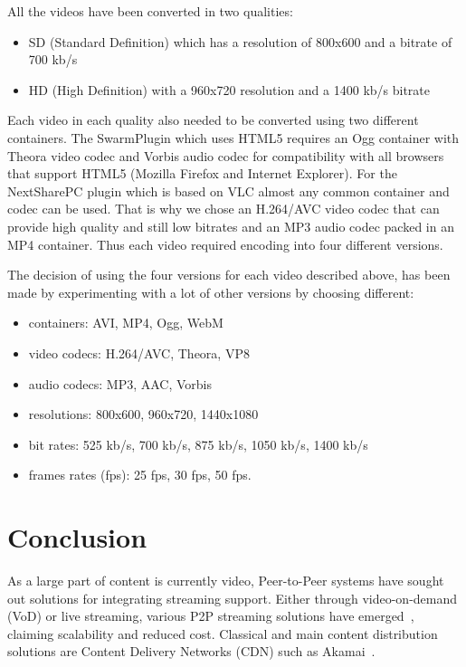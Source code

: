 All the videos have been converted in two qualities: 
\begin{itemize}
  \item SD (Standard Definition) which has a resolution of 800x600 and a
  bitrate of 700 kb/s
  \item HD (High Definition) with a 960x720 resolution and a 1400 kb/s bitrate
\end{itemize}

Each video in each quality also needed to be converted using two different
containers. The SwarmPlugin which uses HTML5 requires an Ogg container with
Theora video codec and Vorbis audio codec for compatibility with all browsers
that support HTML5 (Mozilla Firefox and Internet Explorer). For the
NextSharePC plugin which is based on VLC almost any common container and codec
can be used. That is why we chose an H.264/AVC video codec that can provide
high quality and still low bitrates and an MP3 audio codec packed in an MP4
container. Thus each video required encoding into four different versions.

The decision of using the four versions for each video described above, has
been made by experimenting with a lot of other versions by choosing different:
\begin{itemize}
  \item containers: AVI, MP4, Ogg, WebM
  \item video codecs: H.264/AVC, Theora, VP8
  \item audio codecs: MP3, AAC, Vorbis
  \item resolutions: 800x600, 960x720, 1440x1080
  \item bit rates: 525 kb/s, 700 kb/s, 875 kb/s, 1050 kb/s, 1400 kb/s
  \item frames rates (fps): 25 fps, 30 fps, 50 fps.
\end{itemize}

\section{Conclusion}
\label{subsec:multimedia-dist:conclusion}

As a large part of content is currently video, Peer-to-Peer systems have
sought out solutions for integrating streaming support. Either through video-on-demand
(VoD) or live streaming, various P2P streaming solutions have
emerged~\cite{p2p-streaming-survey}, claiming scalability and reduced cost. Classical and main
content distribution solutions are Content Delivery Networks (CDN) such as
Akamai~\cite{akamai}.

